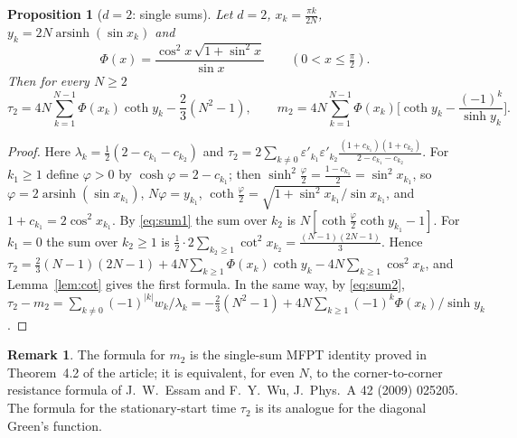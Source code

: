 \documentclass[11pt,a4paper]{article}
\theoremstyle{plain}
\newtheorem{proposition}[theorem]{Proposition}
\theoremstyle{definition}
\newtheorem{remark}[theorem]{Remark}
\numberwithin{equation}{section}
\begin{document}
\begin{proposition}[$d=2$: single sums]\label{prop:d2exact}
Let $d=2$, $x_k=\frac{\pi k}{2N}$, $y_k=2N\operatorname{arsinh}(\sin x_k)$ and
\begin{equation}\label{eq:Phi}
\Phi(x)=\frac{\cos^2x\,\sqrt{1+\sin^2x}}{\sin x}\qquad(0<x\le\tfrac\pi2).
\end{equation}
Then for every $N\ge2$
\begin{equation}\label{eq:tau2exact}
\tau_2=4N\sum_{k=1}^{N-1}\Phi(x_k)\coth y_k-\frac23(N^2-1),\qquad
m_2=4N\sum_{k=1}^{N-1}\Phi(x_k)\Big[\coth y_k-\frac{(-1)^k}{\sinh y_k}\Big].
\end{equation}
\end{proposition}
\begin{proof}
Here $\lambda_k=\frac12(2-c_{k_1}-c_{k_2})$ and $\tau_2=2\sum_{k\ne0}\varepsilon'_{k_1}\varepsilon'_{k_2}\frac{(1+c_{k_1})(1+c_{k_2})}{2-c_{k_1}-c_{k_2}}$. For $k_1\ge1$ define $\varphi>0$ by $\cosh\varphi=2-c_{k_1}$; then $\sinh^2\frac\varphi2=\frac{1-c_{k_1}}{2}=\sin^2x_{k_1}$, so $\varphi=2\operatorname{arsinh}(\sin x_{k_1})$, $N\varphi=y_{k_1}$, $\coth\frac\varphi2=\sqrt{1+\sin^2x_{k_1}}/\sin x_{k_1}$, and $1+c_{k_1}=2\cos^2x_{k_1}$. By \eqref{eq:sum1} the sum over $k_2$ is $N[\coth\frac\varphi2\coth y_{k_1}-1]$. For $k_1=0$ the sum over $k_2\ge1$ is $\frac12\cdot2\sum_{k_2\ge1}\cot^2x_{k_2}=\frac{(N-1)(2N-1)}3$. Hence
$\tau_2=\frac23(N-1)(2N-1)+4N\sum_{k\ge1}\Phi(x_k)\coth y_k-4N\sum_{k\ge1}\cos^2x_k$, and Lemma~\ref{lem:cot} gives the first formula. In the same way, by \eqref{eq:sum2}, $\tau_2-m_2=\sum_{k\ne0}(-1)^{|k|}w_k/\lambda_k=-\frac23(N^2-1)+4N\sum_{k\ge1}(-1)^k\Phi(x_k)/\sinh y_k$.
\end{proof}
\begin{remark}
The formula for $m_2$ is the single-sum MFPT identity proved in Theorem~4.2 of the article; it is equivalent, for even $N$, to the corner-to-corner resistance formula of J.~W.~Essam and F.~Y.~Wu, J.~Phys.~A 42 (2009) 025205. The formula for the stationary-start time $\tau_2$ is its analogue for the diagonal Green's function.
\end{remark}
\end{document}
